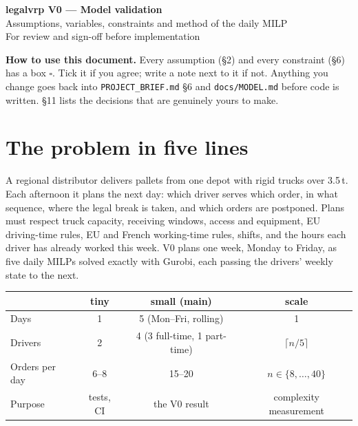 \documentclass[11pt,a4paper]{article}
\newcommand{\ok}{$\square$}
\begin{document}
\begin{center}
{\LARGE\bfseries\color{ink} legalvrp V0 --- Model validation}\\[6pt]
{\large Assumptions, variables, constraints and method of the daily MILP}\\[4pt]
{\color{gray} For review and sign-off before implementation}
\end{center}

\vspace{4pt}
\begin{words}
\textbf{How to use this document.} Every assumption (§2) and every constraint (§6) has a box \ok. Tick it if you agree; write a note next to it if not. Anything you change goes back into \texttt{PROJECT\_BRIEF.md} §6 and \texttt{docs/MODEL.md} before code is written. §11 lists the decisions that are genuinely yours to make.
\end{words}

{\small\tableofcontents}

\section{The problem in five lines}

A regional distributor delivers pallets from one depot with rigid trucks over 3.5\,t. Each afternoon it plans the next day: which driver serves which order, in what sequence, where the legal break is taken, and which orders are postponed. Plans must respect truck capacity, receiving windows, access and equipment, EU driving-time rules, EU and French working-time rules, shifts, and the hours each driver has already worked this week. V0 plans one week, Monday to Friday, as five daily MILPs solved exactly with Gurobi, each passing the drivers' weekly state to the next.

\begin{center}\small
\begin{tabular}{@{}lccc@{}}
\toprule
& \textbf{tiny} & \textbf{small (main)} & \textbf{scale} \\
\midrule
Days & 1 & 5 (Mon--Fri, rolling) & 1 \\
Drivers & 2 & 4 (3 full-time, 1 part-time) & $\lceil n/5\rceil$ \\
Orders per day & 6--8 & 15--20 & $n \in \{8,\dots,40\}$ \\
Purpose & tests, CI & the V0 result & complexity measurement \\
\bottomrule
\end{tabular}
\end{center}
\end{document}
